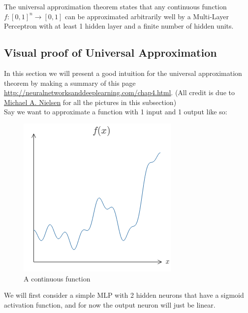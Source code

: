 \documentclass{article}
\begin{document}
The universal approximation theorem states that any continuous function $f :[0,1]^n \xrightarrow{} [0,1]$
can be approximated arbitrarily well by a Multi-Layer Perceptron with at least 1 hidden layer and a finite number of hidden units.  \par

\subsection{Visual proof of Universal Approximation}
In this section we will present a good intuition for the universal approximation theorem by making a summary of this page \href{http://neuralnetworksanddeeplearning.com/chap4.html}{\underline{http://neuralnetworksanddeeplearning.com/chap4.html}}. (All credit is due to \href{http://neuralnetworksanddeeplearning.com/}{\underline{Michael A. Nielsen}} for all the pictures in this subsection) \\

Say we want to approximate a function with 1 input and 1 output like so:
\begin{figure}[H]
    \centering
    \includegraphics[width=.4\textwidth]{figures/function.png}
    \caption{A continuous function}
\end{figure}

We will first consider a simple MLP with 2 hidden neurons that have a sigmoid activation function, and for now the output neuron will just be linear. \\
\end{document}
